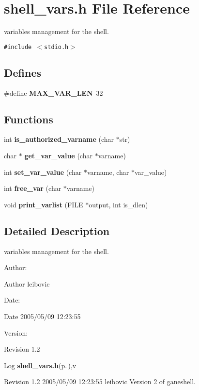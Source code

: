 \section{shell\_\-vars.h File Reference}
\label{shell__vars_8h}
variables management for the shell. 

{\tt \#include $<$stdio.h$>$}\par
\subsection*{Defines}
\begin{CompactItemize}
\item 
\#define {\bf MAX\_\-VAR\_\-LEN}\ 32
\end{CompactItemize}
\subsection*{Functions}
\begin{CompactItemize}
\item 
int {\bf is\_\-authorized\_\-varname} (char $\ast$str)
\item 
char $\ast$ {\bf get\_\-var\_\-value} (char $\ast$varname)
\item 
int {\bf set\_\-var\_\-value} (char $\ast$varname, char $\ast$var\_\-value)
\item 
int {\bf free\_\-var} (char $\ast$varname)
\item 
void {\bf print\_\-varlist} (FILE $\ast$output, int is\_\-dlen)
\end{CompactItemize}


\subsection{Detailed Description}
variables management for the shell. 

\begin{Desc}
\item[Author:]\begin{Desc}
\item[Author]leibovic \end{Desc}
\end{Desc}
\begin{Desc}
\item[Date:]\begin{Desc}
\item[Date]2005/05/09 12:23:55 \end{Desc}
\end{Desc}
\begin{Desc}
\item[Version:]\begin{Desc}
\item[Revision]1.2 \end{Desc}
\end{Desc}
\begin{Desc}
\item[Log]{\bf shell\_\-vars.h}{\rm (p.\,\pageref{shell__vars_8h})},v \end{Desc}
Revision 1.2 2005/05/09 12:23:55 leibovic Version 2 of ganeshell.

